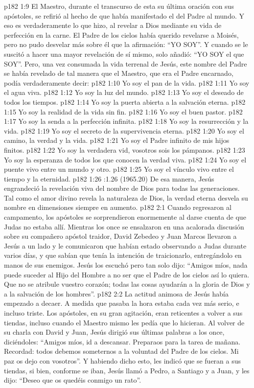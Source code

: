\vs p182 1:9 El Maestro, durante el transcurso de esta su última oración con sus apóstoles, se refirió al hecho de que había manifestado el  del Padre al mundo. Y eso es verdaderamente lo que hizo, al revelar a Dios mediante su vida de perfección en la carne. El Padre de los cielos había querido revelarse a Moisés, pero no pudo desvelar más sobre él que la afirmación: “YO SOY”. Y cuando se le suscitó a hacer una mayor revelación de sí mismo, solo añadió: “YO SOY el que SOY”. Pero, una vez consumada la vida terrenal de Jesús, este nombre del Padre se había revelado de tal manera que el Maestro, que era el Padre encarnado, podía verdaderamente decir:
\vs p182 1:10 Yo soy el pan de la vida.
\vs p182 1:11 Yo soy el agua viva.
\vs p182 1:12 Yo soy la luz del mundo.
\vs p182 1:13 Yo soy el deseado de todos los tiempos.
\vs p182 1:14 Yo soy la puerta abierta a la salvación eterna.
\vs p182 1:15 Yo soy la realidad de la vida sin fin.
\vs p182 1:16 Yo soy el buen pastor.
\vs p182 1:17 Yo soy la senda a la perfección infinita.
\vs p182 1:18 Yo soy la resurrección y la vida.
\vs p182 1:19 Yo soy el secreto de la supervivencia eterna.
\vs p182 1:20 Yo soy el camino, la verdad y la vida.
\vs p182 1:21 Yo soy el Padre infinito de mis hijos finitos.
\vs p182 1:22 Yo soy la verdadera vid, vosotros sois los pámpanos.
\vs p182 1:23 Yo soy la esperanza de todos los que conocen la verdad viva.
\vs p182 1:24 Yo soy el puente vivo entre un mundo y otro.
\vs p182 1:25 Yo soy el vínculo vivo entre el tiempo y la eternidad.
\vs p182 1:26 :1.26 (1965.20) De esa manera, Jesús engrandeció la revelación viva del nombre de Dios para todas las generaciones. Tal como el amor divino revela la naturaleza de Dios, la verdad eterna desvela su nombre en dimensiones siempre en aumento.
\vs p182 2:1 Cuando regresaron al campamento, los apóstoles se sorprendieron enormemente al darse cuenta de que Judas no estaba allí. Mientras los once se ensalzaron en una acalorada discusión sobre su compañero apóstol traidor, David Zebedeo y Juan Marcos llevaron a Jesús a un lado y le comunicaron que habían estado observando a Judas durante varios días, y que sabían que tenía la intención de traicionarlo, entregándolo en manos de sus enemigos. Jesús los escuchó pero tan solo dijo: “Amigos míos, nada puede suceder al Hijo del Hombre a no ser que el Padre de los cielos así lo quiera. Que no se atribule vuestro corazón; todas las cosas ayudarán a la gloria de Dios y a la salvación de los hombres”.
\vs p182 2:2 La actitud animosa de Jesús había empezado a decaer. A medida que pasaba la hora estaba cada vez más serio, e incluso triste. Los apóstoles, en su gran agitación, eran reticentes a volver a sus tiendas, incluso cuando el Maestro mismo les pedía que lo hicieran. Al volver de su charla con David y Juan, Jesús dirigió sus últimas palabras a los once, diciéndoles: “Amigos míos, id a descansar. Preparaos para la tarea de mañana. Recordad: todos debemos someternos a la voluntad del Padre de los cielos. Mi paz os dejo con vosotros”. Y habiendo dicho esto, les indicó que se fueran a sus tiendas, si bien, conforme se iban, Jesús llamó a Pedro, a Santiago y a Juan, y les dijo: “Deseo que os quedéis conmigo un rato”.
